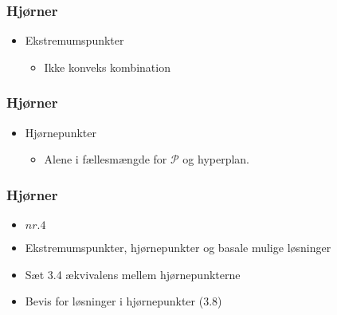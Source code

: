 %
\begin{frame}
\frametitle{Hjørner}
\begin{itemize}
\item Ekstremumspunkter
\begin{itemize}
\item Ikke konveks kombination
\end{itemize}
\end{itemize}
%

\end{frame}
%
%
\begin{frame}
\frametitle{Hjørner}
\begin{itemize}
\item Hjørnepunkter
\begin{itemize}
\item Alene i fællesmængde for $\mathcal{P}$ og hyperplan.
\end{itemize}
\end{itemize}
%

\end{frame}
%
%
%
\begin{frame}
\frametitle{Hjørner}
\begin{itemize}
\item \textbf{$nr. 4$}
\item Ekstremumspunkter, hjørnepunkter og basale mulige løsninger
\item Sæt 3.4 ækvivalens mellem hjørnepunkterne
\item Bevis for løsninger i hjørnepunkter (3.8)
\end{itemize}
\end{frame}